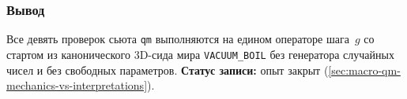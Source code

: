 \subsubsection*{Вывод}
Все девять проверок сьюта \texttt{qm} выполняются на едином операторе шага~$g$ со стартом из канонического $3\mathrm{D}$-сида мира \texttt{VACUUM\_BOIL} без генератора случайных чисел и без свободных параметров.
\textbf{Статус записи:} опыт закрыт (\cref{sec:macro-qm-mechanics-vs-interpretations}).
